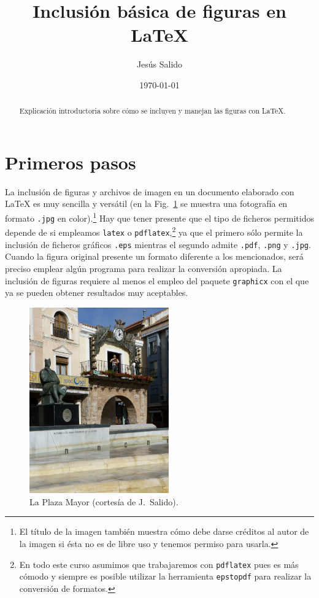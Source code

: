 \documentclass[11pt,a4paper]{article}
\author{Jesús Salido}
\title{Inclusión básica de figuras en \LaTeX{}}
\date{\today}
\begin{document}
\maketitle

\begin{abstract}
	Explicación introductoria sobre cómo se incluyen y manejan las figuras con \LaTeX{}.
\end{abstract}

\tableofcontents
\listoffigures


\section{Primeros pasos}
La inclusión de figuras y archivos de imagen en un documento elaborado con \LaTeX{} es muy sencilla y versátil (en la Fig.~\ref{fig:plazaCR} se muestra una fotografía en formato \texttt{.jpg} en color).\footnote{El título de la imagen también muestra cómo debe darse créditos al autor de la imagen si ésta no es de libre uso y tenemos permiso para usarla.} Hay que tener presente que el tipo de ficheros permitidos depende de si empleamos \texttt{latex} o \texttt{pdflatex},\footnote{En todo este curso asumimos que trabajaremos con \texttt{pdflatex} pues es más cómodo y siempre es posible utilizar la herramienta \texttt{epstopdf} para realizar la conversión de formatos.} ya que el primero sólo permite la inclusión de ficheros gráficos \texttt{.eps} mientras el segundo admite \texttt{.pdf}, \texttt{.png} y \texttt{.jpg}. Cuando la figura original presente un formato diferente a los mencionados, será preciso emplear algún programa para realizar la conversión apropiada. La inclusión de figuras requiere al menos el empleo del paquete \texttt{graphicx} con el que ya se pueden obtener resultados muy aceptables.

\begin{figure}[hbt] %
	\centering %
	\includegraphics[height=8cm]{plazaCR} %
	\caption[Ejemplo de foto en formato jpg]{La Plaza Mayor (cortesía de J.~Salido).} %
	\label{fig:plazaCR} %
\end{figure}
\end{document}
